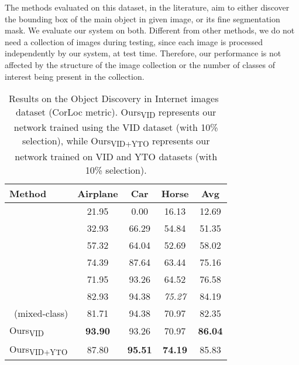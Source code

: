 \documentclass[10pt,twocolumn,letterpaper]{article}
\begin{document}
The methods evaluated on this dataset, in the literature, aim to either discover the bounding box of the main object in given image, or its fine segmentation mask. We evaluate our system on both. Different from other methods, we do not need a collection of images during testing, since each image is processed independently by our system, at test time. Therefore, our performance is not affected by the structure of the image collection or the number of classes of interest being present in the collection.

\begin{table}[t]
\begin{center}
\begin{tabular}{|l|c|c|c|c|}
\hline
Method & Airplane & Car & Horse & Avg\\
\hline\hline
~\cite{kim2011distributed} & 21.95 & 0.00 & 16.13 & 12.69\\
~\cite{joulin2010discriminative} & 32.93 & 66.29 & 54.84 & 51.35 \\
~\cite{joulin2012multi} & 57.32 & 64.04 & 52.69 & 58.02\\
~\cite{rubinstein2013unsupervised} & 74.39 & 87.64 & 63.44 & 75.16\\
~\cite{tang2014co} & 71.95 & 93.26 & 64.52 & 76.58\\
~\cite{cho2015unsupervised} & 82.93 & 94.38 & \color{red}\textit{75.27} & 84.19\\
~\cite{cho2015unsupervised}(mixed-class) & 81.71 & 94.38 & 70.97 & 82.35\\
\hline

Ours\textsubscript{VID} & \textbf{93.90} & 93.26 & 70.97 &  \textbf{86.04}\\
Ours\textsubscript{VID+YTO} & 87.80 & \textbf{95.51} & \textbf{74.19} & 85.83 \\
\hline
\end{tabular}
\end{center}
\caption{Results on the Object Discovery in Internet images~\cite{rubinstein2013unsupervised} dataset (CorLoc metric). Ours\textsubscript{VID} represents our network trained using the VID dataset (with 10\% selection), while Ours\textsubscript{VID+YTO} represents our network trained on VID and YTO datasets (with 10\% selection).}
\label{tab:object_discovery}
\end{table}
\end{document}
